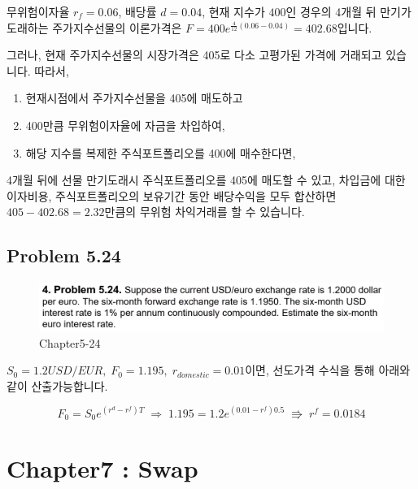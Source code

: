\documentclass[
  letterpaper,
  DIV=11,
  numbers=noendperiod]{scrreprt}
\begin{document}
무위험이자율 \(r_f=0.06\), 배당률 \(d=0.04\), 현재 지수가 \(400\)인
경우의 4개월 뒤 만기가 도래하는 주가지수선물의 이론가격은
\(F=400e^{\frac{4}{12}(0.06-0.04)}=402.68\)입니다.

그러나, 현재 주가지수선물의 시장가격은 405로 다소 고평가된 가격에
거래되고 있습니다. 따라서,

\begin{enumerate}
\def\labelenumi{(\arabic{enumi})}
\item
  현재시점에서 주가지수선물을 405에 매도하고
\item
  400만큼 무위험이자율에 자금을 차입하여,
\item
  해당 지수를 복제한 주식포트폴리오를 400에 매수한다면,
\end{enumerate}

4개월 뒤에 선물 만기도래시 주식포트폴리오를 405에 매도할 수 있고,
차입금에 대한 이자비용, 주식포트폴리오의 보유기간 동안 배당수익을 모두
합산하면 \(405-402.68=2.32\)만큼의 무위험 차익거래를 할 수 있습니다.

\subsection*{\texorpdfstring{\textbf{Problem
5.24}}{Problem 5.24}}\label{problem-5.24}

\begin{figure}[H]

{\centering \includegraphics{images/선물옵션_5-24.png}

}

\caption{Chapter5-24}

\end{figure}%

\(S_0=1.2USD/EUR,\;F_0=1.195,\;r_{domestic}=0.01\)이면, 선도가격 수식을
통해 아래와 같이 산출가능합니다.

\[F_0=S_0e^{(r^d-r^f)T}\;\Rightarrow\;1.195=1.2e^{(0.01-r^f)0.5}\;\Rrightarrow\;r^f=0.0184\]

\section*{Chapter7 : Swap}\label{chapter7-swap}
\end{document}
